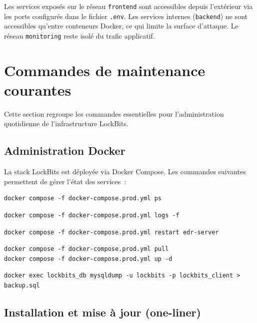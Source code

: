 Les services exposés sur le réseau \texttt{frontend} sont accessibles depuis
l'extérieur via les ports configurés dans le fichier \texttt{.env}. Les
services internes (\texttt{backend}) ne sont accessibles qu'entre conteneurs
Docker, ce qui limite la surface d'attaque. Le réseau \texttt{monitoring}
reste isolé du trafic applicatif.

\section{Commandes de maintenance courantes}

Cette section regroupe les commandes essentielles pour l'administration
quotidienne de l'infrastructure LockBits.

\subsection{Administration Docker}

La stack LockBits est déployée via Docker Compose. Les commandes suivantes
permettent de gérer l'état des services~:

\begin{lstlisting}[language=dockerbash, caption=Voir l'état des services]
docker compose -f docker-compose.prod.yml ps
\end{lstlisting}

\begin{lstlisting}[language=dockerbash, caption=Consulter les logs en temps réel]
docker compose -f docker-compose.prod.yml logs -f
\end{lstlisting}

\begin{lstlisting}[language=dockerbash, caption=Redémarrer un service spécifique]
docker compose -f docker-compose.prod.yml restart edr-server
\end{lstlisting}

\begin{lstlisting}[language=dockerbash, caption=Mettre à jour tous les services]
docker compose -f docker-compose.prod.yml pull
docker compose -f docker-compose.prod.yml up -d
\end{lstlisting}

\begin{lstlisting}[language=dockerbash, caption=Sauvegarder la base MySQL]
docker exec lockbits_db mysqldump -u lockbits -p lockbits_client > backup.sql
\end{lstlisting}

\subsection{Installation et mise à jour (one-liner)}

